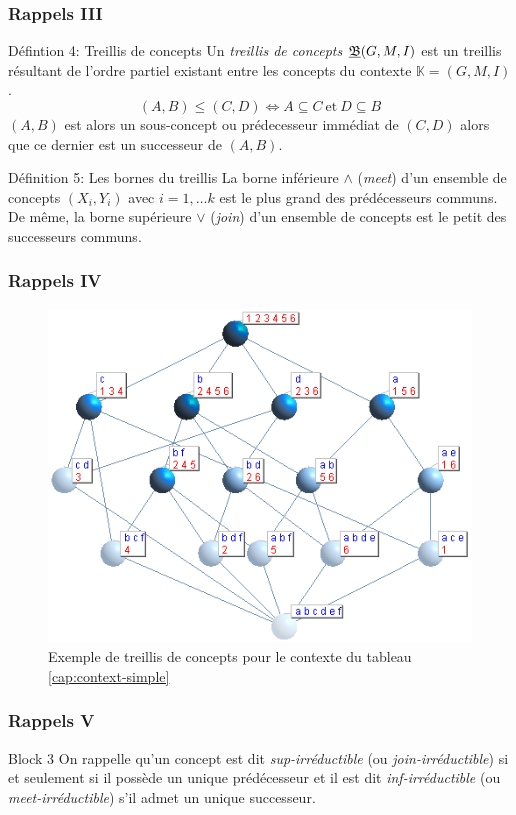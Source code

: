 \documentclass[french]{beamer}
\def\KK{\mathbb{K}}
\begin{document}
\begin{frame}
\frametitle{Rappels III}
\begin{block}{Défintion 4: Treillis de concepts}
Un \textit{treillis de concepts} $\underline{{\mathfrak B}} (G,M,\mathrel{I})$ est un treillis résultant de l'ordre partiel existant entre les concepts du contexte $\KK = (G,M,I)$.
$$(A,B) \leq (C,D) \Leftrightarrow A \subseteq C\ \text{et}\ D \subseteq B$$
$(A, B)$ est alors un sous-concept ou prédecesseur immédiat de $(C, D)$ alors que ce dernier est un successeur de $(A, B)$.
\end{block}

\begin{block}{Définition 5: Les bornes du treillis}
La borne inférieure $\wedge$ (\emph{meet}) d'un ensemble de concepts $(X_i, Y_i)$ avec $i = 1, \ldots k$ est le plus grand des prédécesseurs communs. De même, la borne supérieure $\vee$ (\emph{join}) d'un ensemble de concepts est le petit des successeurs communs.
\end{block}
\end{frame}
\begin{frame}
\frametitle{Rappels IV}
\begin{figure}[H]
\begin{center}\includegraphics[scale=0.50]{figures/exemple-treillis.png}\end{center}
\caption{Exemple de treillis de concepts pour le contexte du tableau \ref{cap:context-simple}}
\end{figure}
\end{frame}
\begin{frame}
\frametitle{Rappels V}

\begin{block}{Block 3}
On rappelle qu'un concept est dit \emph{sup-irréductible} (ou \emph{join-irréductible}) si et seulement si il possède un unique prédécesseur et il est dit \emph{inf-irréductible} (ou \emph{meet-irréductible}) s'il admet un unique successeur.
\end{block}
\end{frame}
\end{document}
